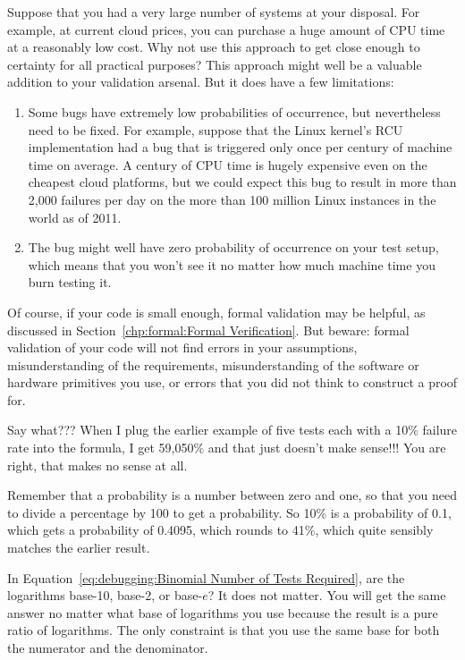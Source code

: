 \QuickQ{}
	Suppose that you had a very large number of systems at your
	disposal.
	For example, at current cloud prices, you can purchase a
	huge amount of CPU time at a reasonably low cost.
	Why not use this approach to get close enough to certainty
	for all practical purposes?
\QuickA{}
	This approach might well be a valuable addition to your
	validation arsenal.
	But it does have a few limitations:
	\begin{enumerate}
	\item	Some bugs have extremely low probabilities of occurrence,
		but nevertheless need to be fixed.
		For example, suppose that the Linux kernel's RCU
		implementation had a bug that is triggered only once
		per century of machine time on average.
		A century of CPU time is hugely expensive even on
		the cheapest cloud platforms, but we could expect
		this bug to result in more than 2,000 failures per day
		on the more than 100 million Linux instances in the
		world as of 2011.
	\item	The bug might well have zero probability of occurrence
		on your test setup, which means that you won't see it
		no matter how much machine time you burn testing it.
	\end{enumerate}
	Of course, if your code is small enough, formal validation
	may be helpful, as discussed in
	Section~\ref{chp:formal:Formal Verification}.
	But beware: formal validation of your code will not find
	errors in your assumptions, misunderstanding of the
	requirements, misunderstanding of the software or hardware
	primitives you use, or errors that you did not think to construct
	a proof for.

\QuickQ{}
	Say what???
	When I plug the earlier example of five tests each with a
	10\% failure rate into the formula, I get 59,050\% and that
	just doesn't make sense!!!
\QuickA{}
	You are right, that makes no sense at all.

	Remember that a probability is a number between zero and one,
	so that you need to divide a percentage by 100 to get a
	probability.
	So 10\% is a probability of 0.1, which gets a probability
	of 0.4095, which rounds to 41\%, which quite sensibly
	matches the earlier result.

\QuickQ{}
	In Equation~\ref{eq:debugging:Binomial Number of Tests Required},
	are the logarithms base-10, base-2, or base-$e$?
\QuickA{}
	It does not matter.
	You will get the same answer no matter what base of logarithms
	you use because the result is a pure ratio of logarithms.
	The only constraint is that you use the same base for both
	the numerator and the denominator.

